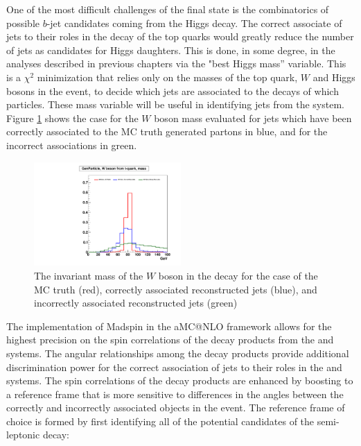 \par One of the most difficult challenges of the \ttH final state is
the combinatorics of possible $b$-jet candidates coming from the Higgs
decay.  The correct associate of jets to their roles in the decay of
the top quarks would greatly reduce the number of jets as candidates
for Higgs daughters.  This is done, in some degree, in the analyses
described in previous chapters via the "best Higgs mass'' variable.
This is a $\chi^{2}$ minimization that relies only on the masses of
the top quark, $W$ and Higgs bosons in the event, to decide which jets
are associated to the decays of which particles.  These mass variable
will be useful in identifying jets from the \ttbar system.  Figure
\ref{fig:aMCatNLO_wMass} shows the case for the $W$ boson mass
evaluated for jets which have been correctly associated to the MC
truth generated partons in blue, and for the incorrect associations in
green.   

\begin{figure}[hbtp] 
  {\centering
    \includegraphics[width=0.50\textwidth]{Figures/Analysis_Improvement_Diagrams/tt012jets__h_genParticle_w_boson_fromTop_mass__vs__h_recoJets_correctAssoc_labFrame_mHadW__vs__h_recoJets_wrongAssoc_labFrame_mHadW__unitNorm.pdf}
    \caption{The invariant mass of the $W$ boson in the \ttbar decay
      for the case of the MC truth (red), correctly associated reconstructed
      jets (blue), and incorrectly associated reconstructed jets (green)}
    \label{fig:aMCatNLO_wMass}}
\end{figure}

\par The implementation of Madspin in the aMC@NLO framework allows for
the highest precision on the spin correlations of the decay
products from the \ttH and \ttbar systems.  The angular relationships
among the decay products provide additional discrimination power for the
correct association of jets to their roles in the \ttH and \ttbar
systems.  The spin correlations of the decay products are enhanced by
boosting to a reference frame that is more sensitive to differences in
the angles between the correctly and incorrectly associated objects in
the event.  The reference frame of choice is formed by first
identifying all of the potential candidates of the semi-leptonic
\ttbar decay:

